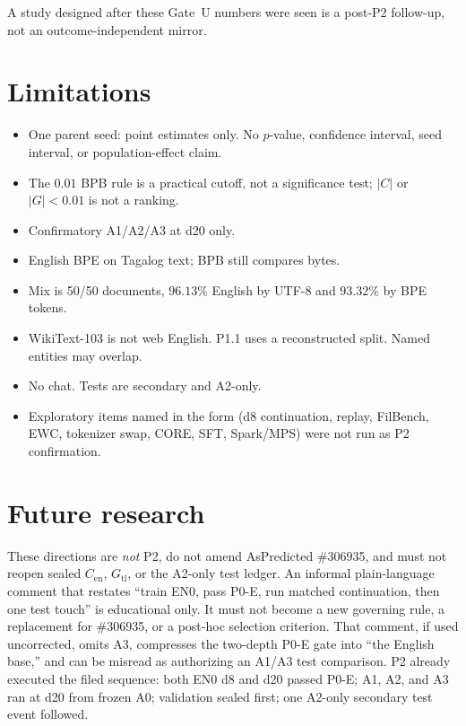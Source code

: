 \documentclass[11pt,a4paper]{article}
\begin{document}
A study designed after these Gate~U numbers were seen is a post-P2 follow-up, not an outcome-independent mirror.

\section{Limitations}
\label{sec:limits}

\begin{itemize}
\item One parent seed: point estimates only. No $p$-value, confidence interval, seed interval, or population-effect claim.
\item The $0.01$ BPB rule is a practical cutoff, not a significance test; $\lvert C\rvert$ or $\lvert G\rvert<0.01$ is not a ranking.
\item Confirmatory A1/A2/A3 at d20 only.
\item English BPE on Tagalog text; BPB still compares bytes.
\item Mix is 50/50 documents, $96.13\%$ English by UTF-8 and $93.32\%$ by BPE tokens.
\item WikiText-103 is not web English. P1.1 uses a reconstructed split. Named entities may overlap.
\item No chat. Tests are secondary and A2-only.
\item Exploratory items named in the form (d8 continuation, replay, FilBench, EWC, tokenizer swap, CORE, SFT, Spark/MPS) were not run as P2 confirmation.
\end{itemize}

\section{Future research}
\label{sec:future}

These directions are \emph{not} P2, do not amend AsPredicted \#306935, and must not reopen sealed \(C_{\mathrm{en}}\), \(G_{\mathrm{tl}}\), or the A2-only test ledger. An informal plain-language comment that restates ``train EN0, pass P0-E, run matched continuation, then one test touch'' is educational only. It must not become a new governing rule, a replacement for \#306935, or a post-hoc selection criterion. That comment, if used uncorrected, omits A3, compresses the two-depth P0-E gate into ``the English base,'' and can be misread as authorizing an A1/A3 test comparison. P2 already executed the filed sequence: both EN0 d8 and d20 passed P0-E; A1, A2, and A3 ran at d20 from frozen A0; validation sealed first; one A2-only secondary test event followed.
\end{document}
